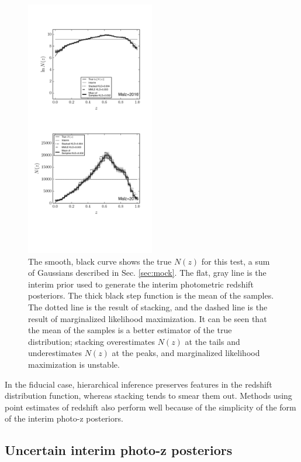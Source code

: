 \documentclass[preprint]{aastex}
\begin{document}
\begin{figure}
\includegraphics[width=0.5\textwidth]{figs/null/comps.pdf}
\caption{The smooth, black curve shows the true $N(z)$ for this test, a sum of 
Gaussians described in Sec. \ref{sec:mock}.  The flat, gray line is the interim 
prior used to generate the interim photometric redshift posteriors.  The thick 
black step function is the mean of the samples.  The dotted line is the result 
of stacking, and the dashed line is the result of marginalized likelihood 
maximization.  It can be seen that the mean of the samples is a better 
estimator of the true distribution; stacking overestimates $N(z)$ at the tails 
and underestimates $N(z)$ at the peaks, and marginalized likelihood 
maximization is unstable.}
\label{fig:null-comp}
\end{figure}

In the fiducial case, hierarchical inference preserves features in the redshift 
distribution function, whereas stacking tends to smear them out.  Methods using 
point estimates of redshift also perform well because of the simplicity of the 
form of the interim photo-z posteriors.

\clearpage
\subsection{Uncertain interim photo-z posteriors}
\label{sec:unc}
\end{document}
